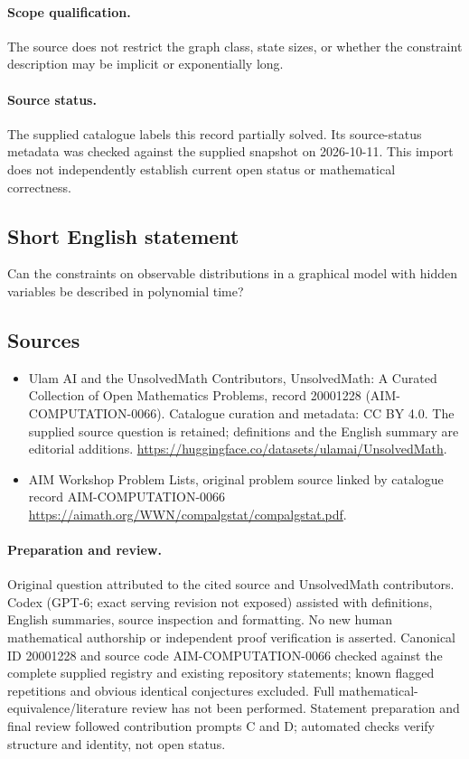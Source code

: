 \documentclass[11pt]{article}
\begin{document}
\paragraph{Scope qualification.}
The source does not restrict the graph class, state sizes, or whether the constraint description may be implicit or exponentially long.
\paragraph{Source status.}
The supplied catalogue labels this record partially solved. Its source-status metadata was checked against the supplied snapshot on 2026-10-11. This import does not independently establish current open status or mathematical correctness.
\subsection{Short English statement}
Can the constraints on observable distributions in a graphical model with hidden variables be described in polynomial time?
\subsection{Sources}
\begin{itemize}
\item[S1] Ulam AI and the UnsolvedMath Contributors, UnsolvedMath: A Curated Collection of Open Mathematics Problems, record 20001228 (AIM-COMPUTATION-0066). Catalogue curation and metadata: CC BY 4.0. The supplied source question is retained; definitions and the English summary are editorial additions.
\url{https://huggingface.co/datasets/ulamai/UnsolvedMath}.
\item[S2] AIM Workshop Problem Lists, original problem source linked by catalogue record AIM-COMPUTATION-0066
\url{https://aimath.org/WWN/compalgstat/compalgstat.pdf}.
\end{itemize}
\paragraph{Preparation and review.}
Original question attributed to the cited source and UnsolvedMath contributors. Codex (GPT-6; exact serving revision not exposed) assisted with definitions, English summaries, source inspection and formatting. No new human mathematical authorship or independent proof verification is asserted. Canonical ID 20001228 and source code AIM-COMPUTATION-0066 checked against the complete supplied registry and existing repository statements; known flagged repetitions and obvious identical conjectures excluded. Full mathematical-equivalence/literature review has not been performed. Statement preparation and final review followed contribution prompts C and D; automated checks verify structure and identity, not open status.
\label{end:20001228}
\end{document}

